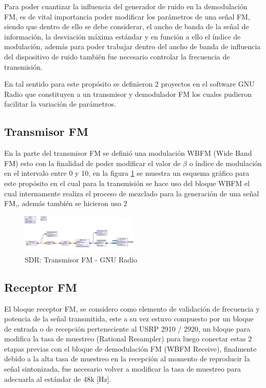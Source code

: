 \documentclass[conference]{IEEEtran}
\begin{document}
	Para poder cuantizar la influencia del generador de ruido en la demodulación FM, es de vital importancia poder modificar los parámetros de una señal FM, siendo que dentro de ello se debe considerar, el ancho de banda de la señal de información, la desviación máxima estándar y en función a ello el índice de modulación, además para poder trabajar dentro del ancho de banda de influencia del dispositivo de ruido también fue necesario controlar la frecuencia de transmisión.
	
	En tal sentido para este propósito se definieron 2 proyectos en el software GNU Radio que constituyen a un transmisor y demodulador FM los cuales pudieron facilitar la variación de parámetros.
	
	\subsection{ Transmisor FM }
	
	En la parte del transmisor FM se definió una modulación WBFM (Wide Band FM) esto con la finalidad de poder modificar el valor de $\beta$ o índice de modulación en el intervalo entre 0 y 10, en la figura \ref{fig:transmisor-fm} se muestra un esquema gráfico para este propósito en el cual para la transmisión se hace uso del bloque WBFM el cual internamente realiza el proceso de mezclado para la generación de una señal FM,, además también se hicieron uso  2
	
	
	\begin{figure}[h]
		\centering
		\includegraphics[width=0.5\textwidth]{media/transmisor-fm}
		\caption{SDR: Transmisor FM - GNU Radio}
		\label{fig:transmisor-fm}
	\end{figure}
	
	
	\subsection{ Receptor FM }
	
	El bloque receptor FM, se considero como elemento de validación de frecuencia y potencia de la señal transmitida, este a su vez estuvo compuesto por un bloque de entrada o de recepción perteneciente al USRP 2910 / 2920, un bloque para modifica la tasa de muestreo (Rational Resampler) para luego conectar estas 2 etapas previas con el bloque de demodulación FM (WBFM Receive), finalmente debido a la alta tasa de muestreo en la recepción al momento de reproducir la señal sintonizada, fue necesario volver a modificar la tasa de muestreo para adecuarla al estándar de 48k [Hz].
	
\end{document}
